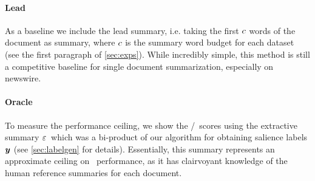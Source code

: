 \paragraph{Lead} As a baseline we include the lead summary, i.e. taking the first 
$c$ words of the document as summary, where $c$ is the 
summary word budget for each dataset (see the 
first paragraph of \autoref{sec:exps}). While incredibly simple, this method is still a 
competitive baseline for single document summarization, especially on newswire.
\paragraph{Oracle} To measure the performance ceiling,
we show the \rouge/\meteor~scores using the 
extractive summary $\varepsilon$~which was a bi-product of our algorithm
for obtaining salience labels $\boldsymbol{y}$ (see \autoref{sec:labelgen} for details). Essentially, this summary represents
an approximate ceiling on \rouge~performance, as it has clairvoyant
knowledge
of the human reference summaries for each document.











